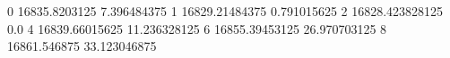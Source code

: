 0 16835.8203125 7.396484375
1 16829.21484375 0.791015625
2 16828.423828125 0.0
4 16839.66015625 11.236328125
6 16855.39453125 26.970703125
8 16861.546875 33.123046875
